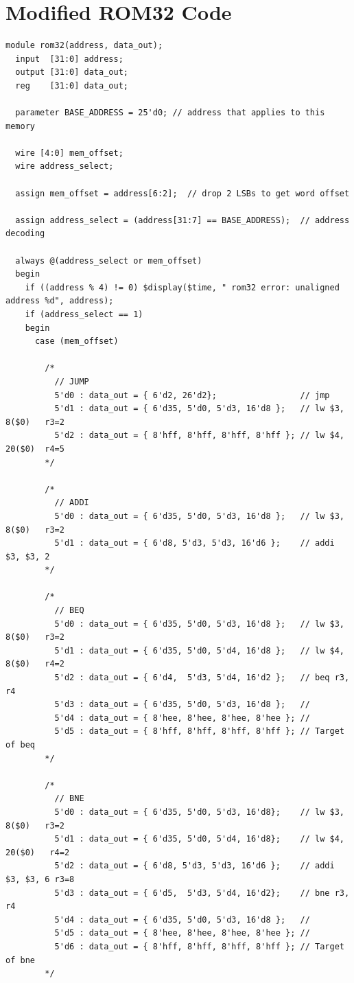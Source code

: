 \documentclass[12pt]{article}
\begin{document}
\section{Modified ROM32 Code}
{\tiny
\begin{verbatim}
module rom32(address, data_out);
  input  [31:0] address;
  output [31:0] data_out;
  reg    [31:0] data_out;

  parameter BASE_ADDRESS = 25'd0; // address that applies to this memory

  wire [4:0] mem_offset;
  wire address_select;

  assign mem_offset = address[6:2];  // drop 2 LSBs to get word offset

  assign address_select = (address[31:7] == BASE_ADDRESS);  // address decoding

  always @(address_select or mem_offset)
  begin
    if ((address % 4) != 0) $display($time, " rom32 error: unaligned address %d", address);
    if (address_select == 1)
    begin
      case (mem_offset)

        /*
          // JUMP
          5'd0 : data_out = { 6'd2, 26'd2};                 // jmp
          5'd1 : data_out = { 6'd35, 5'd0, 5'd3, 16'd8 };   // lw $3, 8($0)   r3=2
          5'd2 : data_out = { 8'hff, 8'hff, 8'hff, 8'hff }; // lw $4, 20($0)  r4=5
        */

        /*
          // ADDI
          5'd0 : data_out = { 6'd35, 5'd0, 5'd3, 16'd8 };   // lw $3, 8($0)   r3=2
          5'd1 : data_out = { 6'd8, 5'd3, 5'd3, 16'd6 };    // addi $3, $3, 2
        */

        /*
          // BEQ
          5'd0 : data_out = { 6'd35, 5'd0, 5'd3, 16'd8 };   // lw $3, 8($0)   r3=2
          5'd1 : data_out = { 6'd35, 5'd0, 5'd4, 16'd8 };   // lw $4, 8($0)   r4=2
          5'd2 : data_out = { 6'd4,  5'd3, 5'd4, 16'd2 };   // beq r3, r4
          5'd3 : data_out = { 6'd35, 5'd0, 5'd3, 16'd8 };   //
          5'd4 : data_out = { 8'hee, 8'hee, 8'hee, 8'hee }; //
          5'd5 : data_out = { 8'hff, 8'hff, 8'hff, 8'hff }; // Target of beq
        */

        /*
          // BNE
          5'd0 : data_out = { 6'd35, 5'd0, 5'd3, 16'd8};    // lw $3, 8($0)   r3=2
          5'd1 : data_out = { 6'd35, 5'd0, 5'd4, 16'd8};    // lw $4, 20($0)   r4=2
          5'd2 : data_out = { 6'd8, 5'd3, 5'd3, 16'd6 };    // addi $3, $3, 6 r3=8
          5'd3 : data_out = { 6'd5,  5'd3, 5'd4, 16'd2};    // bne r3, r4
          5'd4 : data_out = { 6'd35, 5'd0, 5'd3, 16'd8 };   //
          5'd5 : data_out = { 8'hee, 8'hee, 8'hee, 8'hee }; //
          5'd6 : data_out = { 8'hff, 8'hff, 8'hff, 8'hff }; // Target of bne
        */


\end{verbatim}}
\end{document}
